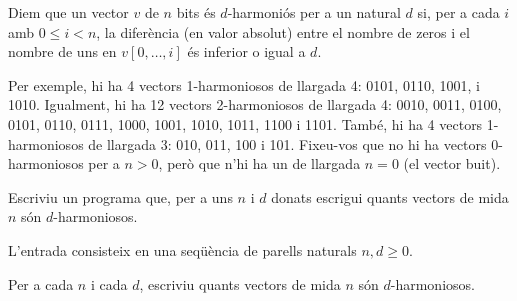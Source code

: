 

\Statement

Diem que un vector $v$ de $n$ bits és $d$-harmoniós per a un natural $d$ si,
per a cada $i$ amb $0\le i<n$, la diferència
(en valor absolut) entre el nombre
de zeros i el nombre de uns en $v[0,\dots,i]$ és inferior
o igual a $d$.

\medskip

Per exemple,
hi ha 4 vectors
1-harmoniosos de llargada 4:
0101,
0110,
1001, i
1010.
Igualment,
hi ha 12 vectors
2-harmoniosos de llargada 4:
0010,
0011,
0100,
0101,
0110,
0111,
1000,
1001,
1010,
1011,
1100 i
1101.
També, hi ha 4 vectors 1-harmoniosos de llargada 3:
010,
011,
100 i
101. Fixeu-vos que no hi ha vectors
0-harmoniosos per a $n>0$, però que n'hi ha un de llargada $n=0$ (el vector buit).

\medskip

Escriviu un programa que, per a uns $n$ i $d$ donats escrigui quants vectors
de mida $n$ són $d$-harmoniosos.

\Input

L'entrada consisteix en una seqüència de parells naturals $n, d \ge 0$.


\Output

Per a cada $n$ i cada $d$, escriviu quants vectors
de mida $n$ són $d$-harmoniosos.


\Sample
